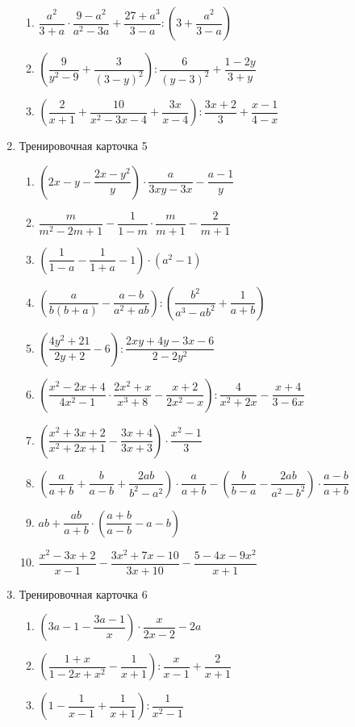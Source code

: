 \documentclass[12pt, a4paper]{article}
\begin{document}
\begin{enumerate}
\begin{enumerate}[label=\asbuk*)]
 		\item \(\dfrac{a^2}{3+a}\cdot\dfrac{9-a^2}{a^2-3a}+\dfrac{27+a^3}{3-a}:\left( 3+\dfrac{a^2}{3-a} \right)\)
 		\item \(\left( \dfrac{9}{y^2-9}+\dfrac{3}{(3-y)^2} \right):\dfrac{6}{(y-3)^2}+\dfrac{1-2y}{3+y}\)
 		\item \(\left( \dfrac{2}{x+1}+\dfrac{10}{x^2-3x-4}+\dfrac{3x}{x-4} \right):\dfrac{3x+2}{3}+\dfrac{x-1}{4-x}\)
  	\end{enumerate}
  \item Тренировочная карточка 5
  \begin{enumerate}[label=\asbuk*)]
  		\item \(\left( 2x-y-\dfrac{2x-y^2}{y} \right)\cdot\dfrac{a}{3xy-3x}-\dfrac{a-1}{y}\)
  		\item \(\dfrac{m}{m^2-2m+1}-\dfrac{1}{1-m}\cdot\dfrac{m}{m+1}-\dfrac{2}{m+1}\)
  		\item \(\left( \dfrac{1}{1-a}-\dfrac{1}{1+a} -1\right)\cdot(a^2-1)\)
  		\item \(\left( \dfrac{a}{b(b+a)}-\dfrac{a-b}{a^2+ab} \right):\left(\dfrac{b^2}{a^3-ab^2}+\dfrac{1}{a+b}\right)\)
  		 \item \(\left( \dfrac{4y^2+21}{2y+2}-6 \right):\dfrac{2xy+4y-3x-6 }{2-2y^2}\)
  		\item \(\left( \dfrac{x^2-2x+4}{4x^2-1}\cdot\dfrac{2x^2+x}{x^3+8}-\dfrac{x+2}{2x^2-x} \right):\dfrac{4}{x^2+2x}-\dfrac{x+4}{3-6x}\)
  		\item \(\left( \dfrac{x^2+3x+2}{x^2+2x+1}-\dfrac{3x+4}{3x+3} \right)\cdot\dfrac{x^2-1}{3}\)
  		\item \(\left( \dfrac{a}{a+b}+\dfrac{b}{a-b}+\dfrac{2ab}{b^2-a^2} \right)\cdot\dfrac{a}{a+b}-\left( \dfrac{b}{b-a}-\dfrac{2ab}{a^2-b^2} \right)\cdot\dfrac{a-b}{a+b}\)
  		\item \(ab+\dfrac{ab}{a+b}\cdot\left( \dfrac{a+b}{a-b} -a-b\right)\)
  		\item \(\dfrac{x^2-3x+2}{x-1}-\dfrac{3x^2+7x-10}{3x+10}-\dfrac{5-4x-9x^2}{x+1}\)
  \end{enumerate}
		\item Тренировочная карточка 6
		\begin{enumerate}[label=\asbuk*)]
			\item \( \left( 3a-1-\dfrac{3a-1}{x} \right) \cdot\dfrac{x}{2x-2}-2a\)
			\item \( \left( \dfrac{1+x}{1-2x+x^2}-\dfrac{1}{x+1} \right):\dfrac{x}{x-1}+\dfrac{2}{x+1} \)
			\item \( \left( 1-\dfrac{1}{x-1}+\dfrac{1}{x+1} \right) :\dfrac{1}{x^2-1}\)

\end{enumerate}
\end{enumerate}
\end{document}
